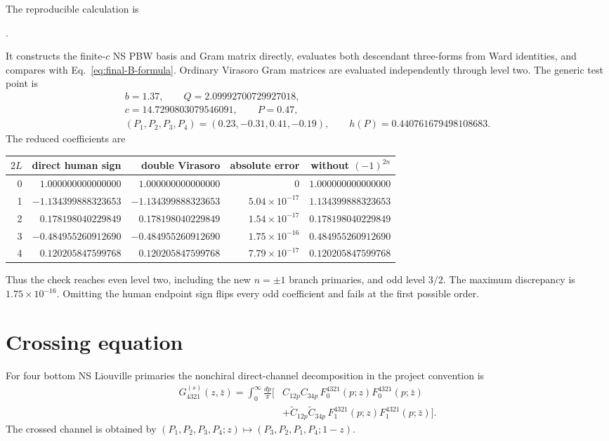 \documentclass[11pt]{article}
\begin{document}
The reproducible calculation is
\begin{center}
 .
\end{center}
It constructs the finite-\(c\) NS PBW basis and Gram matrix directly,
evaluates both descendant three-forms from Ward identities, and compares
with Eq.~\eqref{eq:final-B-formula}.  Ordinary Virasoro Gram matrices
are evaluated independently through level two.  The generic test point is
\begin{gather}
 b=1.37,\qquad Q=2.09992700729927018,
 \nonumber\\
 c=14.7290803079546091,\qquad P=0.47,
 \nonumber\\
 (P_1,P_2,P_3,P_4)=(0.23,-0.31,0.41,-0.19),\qquad
 h(P)=0.440761679498108683.
 \label{eq:numeric-point}
\end{gather}
The reduced coefficients are
\begin{center}
\begin{tabular}{@{}rrrrr@{}}
\toprule
\(2L\)&direct human sign&double Virasoro&absolute error&without \((-1)^{2n}\)\\
\midrule
0&\( 1.000000000000000\)&\( 1.000000000000000\)&0&\( 1.000000000000000\)\\
1&\(-1.134399888323653\)&\(-1.134399888323653\)&\(5.04\times10^{-17}\)&\( 1.134399888323653\)\\
2&\( 0.178198040229849\)&\( 0.178198040229849\)&\(1.54\times10^{-17}\)&\( 0.178198040229849\)\\
3&\(-0.484955260912690\)&\(-0.484955260912690\)&\(1.75\times10^{-16}\)&\( 0.484955260912690\)\\
4&\( 0.120205847599768\)&\( 0.120205847599768\)&\(7.79\times10^{-17}\)&\( 0.120205847599768\)\\
\bottomrule
\end{tabular}
\end{center}
Thus the check reaches even level two, including the new \(n=\pm1\) branch
primaries, and odd level \(3/2\).  The maximum discrepancy is
\(1.75\times10^{-16}\).  Omitting the human endpoint sign flips every odd
coefficient and fails at the first possible order.

\section{Crossing equation}

For four bottom NS Liouville primaries the nonchiral direct-channel
decomposition in the project convention is
\begin{align}
 G_{4321}^{(s)}(z,\bar z)
 =\int_0^\infty\frac{dp}{\pi}\bigl[&
 C_{12p}C_{34p}\,F_0^{4321}(p;z)F_0^{4321}(p;\bar z)
 \nonumber\\[-0.2em]
 &+\widetilde C_{12p}\widetilde C_{34p}\,
 F_1^{4321}(p;z)F_1^{4321}(p;\bar z)\bigr].
 \label{eq:s-channel-crossing}
\end{align}
The crossed channel is obtained by
\((P_1,P_2,P_3,P_4;z)\mapsto(P_3,P_2,P_1,P_4;1-z)\).
\end{document}
